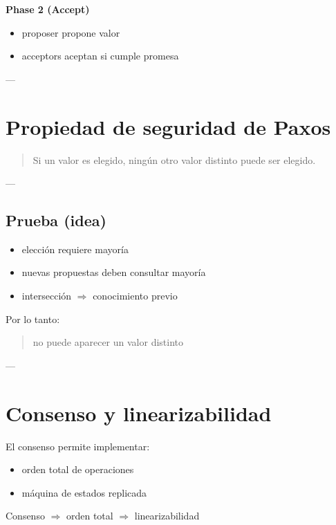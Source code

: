 \documentclass[variant=apuntes,cover=institutional,mode=screen]{ua-engineering-v6-article}
\begin{document}
\textbf{Phase 2 (Accept)}
\begin{itemize}
\item proposer propone valor
\item acceptors aceptan si cumple promesa
\end{itemize}

---

\section{Propiedad de seguridad de Paxos}

\begin{quote}
Si un valor es elegido, ningún otro valor distinto puede ser elegido.
\end{quote}

---

\subsection{Prueba (idea)}

\begin{itemize}
\item elección requiere mayoría
\item nuevas propuestas deben consultar mayoría
\item intersección $\Rightarrow$ conocimiento previo
\end{itemize}

Por lo tanto:

\begin{quote}
no puede aparecer un valor distinto
\end{quote}

---

\section{Consenso y linearizabilidad}

El consenso permite implementar:

\begin{itemize}
\item orden total de operaciones
\item máquina de estados replicada
\end{itemize}

\begin{uakeybox}
Consenso $\Rightarrow$ orden total $\Rightarrow$ linearizabilidad
\end{uakeybox}
\end{document}
